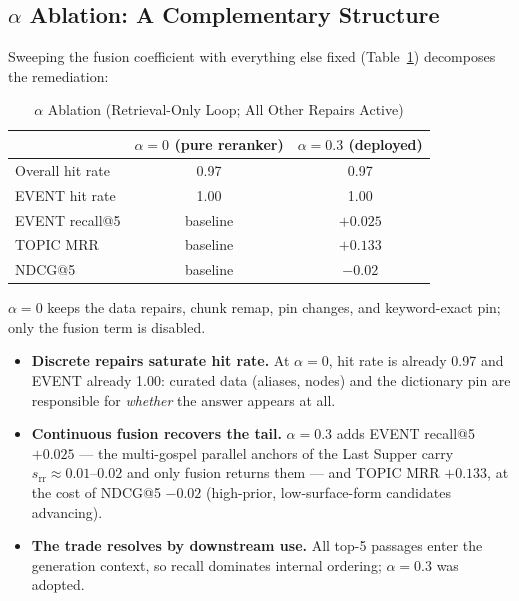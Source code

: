 \subsection{$\alpha$ Ablation: A Complementary Structure}
\label{sec:ablation}

Sweeping the fusion coefficient with everything else fixed
(Table~\ref{tab:ablation}) decomposes the remediation:

\begin{table}[!t]
\caption{$\alpha$ Ablation (Retrieval-Only Loop; All Other Repairs
Active)}
\label{tab:ablation}
\centering
\begin{threeparttable}
\begin{tabular}{@{}lcc@{}}
\toprule
 & $\alpha=0$ (pure reranker) & $\alpha=0.3$ (deployed) \\
\midrule
Overall hit rate & 0.97 & 0.97 \\
EVENT hit rate & 1.00 & 1.00 \\
EVENT recall@5 & baseline & $+0.025$ \\
TOPIC MRR & baseline & $+0.133$ \\
NDCG@5 & baseline & $-0.02$ \\
\bottomrule
\end{tabular}
\begin{tablenotes}\footnotesize
\item $\alpha=0$ keeps the data repairs, chunk remap, pin changes, and
keyword-exact pin; only the fusion term is disabled.
\end{tablenotes}
\end{threeparttable}
\end{table}

\begin{itemize}
\item \textbf{Discrete repairs saturate hit rate.} At $\alpha=0$, hit
rate is already 0.97 and EVENT already 1.00: curated data (aliases,
nodes) and the dictionary pin are responsible for \emph{whether} the
answer appears at all.
\item \textbf{Continuous fusion recovers the tail.} $\alpha=0.3$ adds
EVENT recall@5 $+0.025$ --- the multi-gospel parallel anchors of the
Last Supper carry $s_{\mathrm{rr}}\approx 0.01$--$0.02$ and only fusion
returns them --- and TOPIC MRR $+0.133$, at the cost of NDCG@5
$-0.02$ (high-prior, low-surface-form candidates advancing).
\item \textbf{The trade resolves by downstream use.} All top-5 passages
enter the generation context, so recall dominates internal ordering;
$\alpha=0.3$ was adopted.
\end{itemize}

